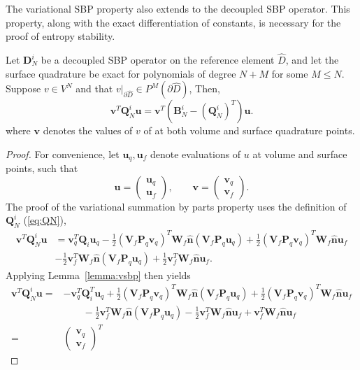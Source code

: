 \documentclass[review]{siamart0216}
\theoremstyle{assumption}
\renewcommand{\hat}[1]{\widehat{#1}}
\newcommand{\LRp}[1]{\left( #1 \right)}
\newcommand{\LRl}[1]{\left. #1 \right|}
\begin{document}
The variational SBP property also extends to the decoupled SBP operator.  This property, along with the exact differentiation of constants, is necessary for the proof of entropy stability.  
\begin{lemma}
Let $\bm{D}^i_N$ be a decoupled SBP operator on the reference element $\hat{D}$, and let the surface quadrature be exact for polynomials of degree $N+M$ for some $M \leq N$.  Suppose $v\in V^N$ and that $\LRl{v}_{\partial \hat{D}} \in P^M\LRp{\partial \hat{D}}$, Then, 
\[
\bm{v}^T\bm{Q}^i_N\bm{u} = \bm{v}^T\LRp{\bm{B}^i_N - \LRp{\bm{Q}^i_N}^T}\bm{u}.%
\]
where $\bm{v}$ denotes the values of $v$ of at both volume and surface quadrature points.  
\label{lemma:vdsbp}
\end{lemma}
\begin{proof}
For convenience, let $\bm{u}_q, \bm{u}_f$ denote evaluations of $u$ at volume and surface points, such that 
\[
\bm{u} = \begin{pmatrix} \bm{u}_q\\ \bm{u}_f\end{pmatrix}, \qquad \bm{v} = \begin{pmatrix} \bm{v}_q\\ \bm{v}_f\end{pmatrix}.  
\]
The proof of the variational summation by parts property uses the definition of $\bm{Q}^i_N$ (\ref{eq:QN}), 
\begin{align*}
\bm{v}^T\bm{Q}^i_N\bm{u} &= \bm{v}_q^T\bm{Q}_i \bm{u}_q - \frac{1}{2}\LRp{\bm{V}_f\bm{P}_q\bm{v}_q}^T\bm{W}_f\hat{\bm{n}} \LRp{\bm{V}_f\bm{P}_q\bm{u}_q} + \frac{1}{2}\LRp{\bm{V}_f\bm{P}_q\bm{v}_q}^T\bm{W}_f\hat{\bm{n}} \bm{u}_f\\
& - \frac{1}{2}\bm{v}_f^T\bm{W}_f\hat{\bm{n}} \LRp{\bm{V}_f\bm{P}_q\bm{u}_q} + \frac{1}{2}\bm{v}_f^T\bm{W}_f\hat{\bm{n}} \bm{u}_f.
\end{align*}
Applying Lemma~\ref{lemma:vsbp} then yields
\begin{align*}
\bm{v}^T\bm{Q}^i_N\bm{u} =& -\bm{v}_q^T\bm{Q}^T_i \bm{u}_q + \frac{1}{2}\LRp{\bm{V}_f\bm{P}_q\bm{v}_q}^T\bm{W}_f\hat{\bm{n}} \LRp{\bm{V}_f\bm{P}_q\bm{u}_q} + \frac{1}{2}\LRp{\bm{V}_f\bm{P}_q\bm{v}_q}^T\bm{W}_f\hat{\bm{n}} \bm{u}_f\\
&\qquad - \frac{1}{2}\bm{v}_f^T\bm{W}_f\hat{\bm{n}} \LRp{\bm{V}_f\bm{P}_q\bm{u}_q} - \frac{1}{2}\bm{v}_f^T\bm{W}_f\hat{\bm{n}} \bm{u}_f + \bm{v}_f^T\bm{W}_f\hat{\bm{n}} \bm{u}_f\\
=& \begin{pmatrix} \bm{v}_q\\ \bm{v}_f\end{pmatrix}^T 

\end{align*}
\end{proof}
\end{document}

